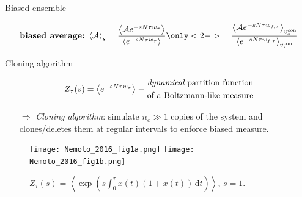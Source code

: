 \documentclass{beamer}
\begin{document}
\begin{frame}[t]{Biased ensemble}

\begin{align*}
\text{\bf biased average:}~\left<\mathcal{A}\right>_s = \frac{\left<\mathcal{A} e^{-s N \tau w_{\tau}}\right>}{\left<e^{-s N \tau w_{\tau}}\right>} \only<2->{=\frac{\left<\mathcal{A} e^{-s N \tau w_{f, \tau}}\right>_{v^{\rm con}_s}}{\left<e^{-s N \tau w_{f, \tau}}\right>_{v^{\rm con}_s}}}
\end{align*}


\end{frame}

\begin{frame}{Cloning algorithm}

\vspace{-10pt}
\begin{align*}
Z_{\tau}(s) = \left<e^{-s N \tau w_{\tau}}\right> \equiv \begin{split}&\text{{\it dynamical} partition function}\\ &\text{of a Boltzmann-like measure}\end{split}
\end{align*}

\pause
\begin{itemize}
  \item[$\Rightarrow$] \textit{Cloning algorithm}: simulate $n_c \gg 1$ copies of the system and clones/deletes them at regular intervals to enforce biased measure.
\end{itemize}

\begin{figure}
\centering
\texttt{[image: Nemoto\_2016\_fig1a.png]}
\texttt{[image: Nemoto\_2016\_fig1b.png]}
\caption{$Z_{\tau}(s) = \left<\exp\left(s \int_0^{\tau} x(t)(1 + x(t)) \, \text{d}t\right)\right>$, $s = 1$. }
\end{figure}

\end{frame}
\end{document}
